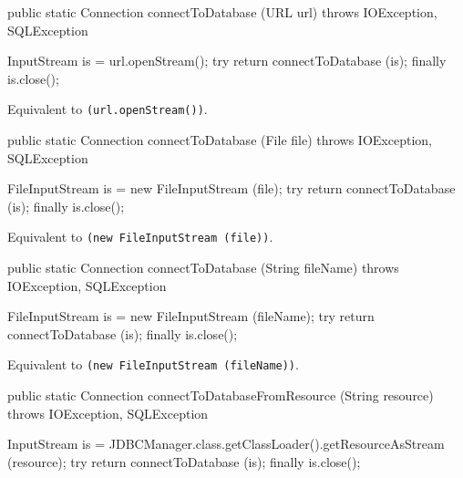 \begin{code}

   public static Connection connectToDatabase (URL url)
            throws IOException, SQLException\begin{hide} {
    
      InputStream is = url.openStream();
      try {
         return connectToDatabase (is);
      }
      finally {
         is.close();
      }
   }\end{hide}
\end{code}
\begin{tabb}
   Equivalent to  \texttt{(url.openStream())}.
\end{tabb}
\begin{code}

   public static Connection connectToDatabase (File file)
            throws IOException, SQLException\begin{hide} {
    
      FileInputStream is = new FileInputStream (file);
      try {
         return connectToDatabase (is);
      }
      finally {
         is.close();
      }
   }\end{hide}
\end{code}
\begin{tabb}
   Equivalent to  \texttt{(new FileInputStream (file))}.
\end{tabb}
\begin{code}

   public static Connection connectToDatabase (String fileName)
            throws IOException, SQLException\begin{hide} {

      FileInputStream is = new FileInputStream (fileName);
      try {
         return connectToDatabase (is);
      }
      finally {
         is.close();
      }
   }\end{hide}
\end{code}
\begin{tabb}
   Equivalent to  \texttt{(new FileInputStream (fileName))}.
\end{tabb}
\begin{code}
    
   public static Connection connectToDatabaseFromResource (String resource)
            throws IOException, SQLException\begin{hide} {
        
      InputStream is = JDBCManager.class.getClassLoader().getResourceAsStream (resource);
      try {
         return connectToDatabase (is);
      }
      finally {
         is.close();
      }
   }\end{hide}
\end{code}
